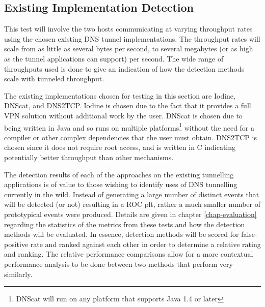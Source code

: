 \documentclass[12pt]{report}
\theoremstyle{remark}
\theoremstyle{definition}
\theoremstyle{definition}
\theoremstyle{definition}
\begin{document}

\subsection{Existing Implementation Detection}
\label{test-existing}
This test will involve the two hosts communicating at varying throughput rates
using the chosen existing DNS tunnel implementations. The throughput rates will scale
from as little as several bytes per second, to several megabytes (or as high as
the tunnel applications can support) per second. The wide range of throughputs
used is done to give an indication of how the detection methods scale with
tunneled throughput.

The existing implementations chosen for testing in this section are
Iodine\cite{iodinesrc}, DNScat\cite{dnscatsrc}, and DNS2TCP\cite{dns2tcpsrc}.
Iodine is chosen due to the fact that it provides a full VPN solution without
additional work by the user. DNScat is chosen due to being written in Java and
so runs on multiple platforms\footnote{DNScat will run on any platform that
supports Java 1.4 or later\cite{dnscatsrc}} without the need for a compiler or
other complex dependencies that the user must obtain. DNS2TCP is chosen since it
does not require root access, and is written in C indicating potentially better
throughput than other mechanisms.

The detection results of each of the approaches on the existing tunnelling
applications is of value to those wishing to identify uses of DNS tunnelling
currently in the wild. Instead of generating a large number of distinct events
that will be detected (or not) resulting in a ROC plt, rather a much smaller
number of prototypical events were produced. Details are given in chapter
\ref{chap-evaluation} regarding the statistics of the metrics from these tests
and how the detection methods will be evaluated. In essence, detection methods
will be scored for false-positive rate and ranked against each other in order to
determine a relative rating and ranking. The relative performance comparisons
allow for a more contextual performance analysis to be done between two methods
that perform very similarly.
\end{document}

